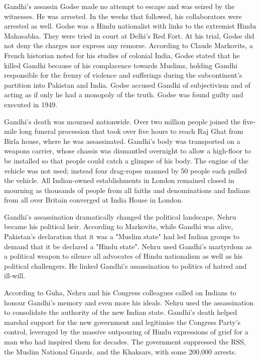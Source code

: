 Gandhi's assassin Godse made no attempt to escape and was seized by the
witnesses. He was arrested. In the weeks that followed, his
collaborators were arrested as well. Godse was a Hindu nationalist with
links to the extremist Hindu Mahasabha. They were tried in court at
Delhi's Red Fort. At his trial, Godse did not deny the charges nor
express any remorse. According to Claude Markovits, a French historian
noted for his studies of colonial India, Godse stated that he killed
Gandhi because of his complacence towards Muslims, holding Gandhi
responsible for the frenzy of violence and sufferings during the
subcontinent's partition into Pakistan and India. Godse accused Gandhi
of subjectivism and of acting as if only he had a monopoly of the truth.
Godse was found guilty and executed in 1949.

Gandhi's death was mourned nationwide. Over two million people joined
the five-mile long funeral procession that took over five hours to reach
Raj Ghat from Birla house, where he was assassinated. Gandhi's body was
transported on a weapons carrier, whose chassis was dismantled overnight
to allow a high-floor to be installed so that people could catch a
glimpse of his body. The engine of the vehicle was not used; instead
four drag-ropes manned by 50 people each pulled the vehicle. All
Indian-owned establishments in London remained closed in mourning as
thousands of people from all faiths and denominations and Indians from
all over Britain converged at India House in London.

Gandhi's assassination dramatically changed the political landscape.
Nehru became his political heir. According to Markovits, while Gandhi
was alive, Pakistan's declaration that it was a "Muslim state" had led
Indian groups to demand that it be declared a "Hindu state". Nehru used
Gandhi's martyrdom as a political weapon to silence all advocates of
Hindu nationalism as well as his political challengers. He linked
Gandhi's assassination to politics of hatred and ill-will.

According to Guha, Nehru and his Congress colleagues called on Indians
to honour Gandhi's memory and even more his ideals. Nehru used the
assassination to consolidate the authority of the new Indian state.
Gandhi's death helped marshal support for the new government and
legitimise the Congress Party's control, leveraged by the massive
outpouring of Hindu expressions of grief for a man who had inspired them
for decades. The government suppressed the RSS, the Muslim National
Guards, and the Khaksars, with some 200,000 arrests.

